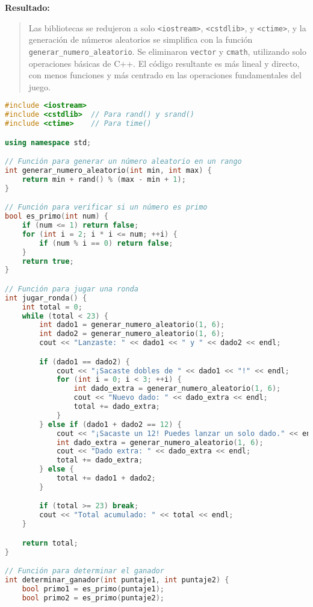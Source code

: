 \documentclass{article}
\begin{document}
\textbf{Resultado:}
\begin{quote}
Las bibliotecas se redujeron a solo \verb|<iostream>|, \verb|<cstdlib>|, y \verb|<ctime>|, y la generación de números aleatorios se simplifica con la función \verb|generar_numero_aleatorio|. Se eliminaron \verb|vector| y \verb|cmath|, utilizando solo operaciones básicas de C++. El código resultante es más lineal y directo, con menos funciones y más centrado en las operaciones fundamentales del juego.
\end{quote}
\begin{lstlisting}[language=C++, Caption=Código en C++]
#include <iostream>
#include <cstdlib>  // Para rand() y srand()
#include <ctime>    // Para time()

using namespace std;

// Función para generar un número aleatorio en un rango
int generar_numero_aleatorio(int min, int max) {
    return min + rand() % (max - min + 1);
}

// Función para verificar si un número es primo
bool es_primo(int num) {
    if (num <= 1) return false;
    for (int i = 2; i * i <= num; ++i) {
        if (num % i == 0) return false;
    }
    return true;
}

// Función para jugar una ronda
int jugar_ronda() {
    int total = 0;
    while (total < 23) {
        int dado1 = generar_numero_aleatorio(1, 6);
        int dado2 = generar_numero_aleatorio(1, 6);
        cout << "Lanzaste: " << dado1 << " y " << dado2 << endl;

        if (dado1 == dado2) {
            cout << "¡Sacaste dobles de " << dado1 << "!" << endl;
            for (int i = 0; i < 3; ++i) {
                int dado_extra = generar_numero_aleatorio(1, 6);
                cout << "Nuevo dado: " << dado_extra << endl;
                total += dado_extra;
            }
        } else if (dado1 + dado2 == 12) {
            cout << "¡Sacaste un 12! Puedes lanzar un solo dado." << endl;
            int dado_extra = generar_numero_aleatorio(1, 6);
            cout << "Dado extra: " << dado_extra << endl;
            total += dado_extra;
        } else {
            total += dado1 + dado2;
        }

        if (total >= 23) break;
        cout << "Total acumulado: " << total << endl;
    }

    return total;
}

// Función para determinar el ganador
int determinar_ganador(int puntaje1, int puntaje2) {
    bool primo1 = es_primo(puntaje1);
    bool primo2 = es_primo(puntaje2);


\end{lstlisting}
\end{document}

